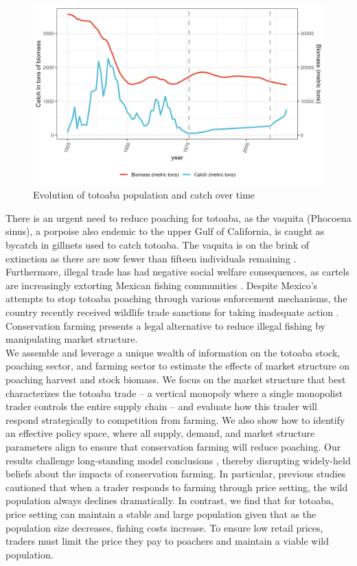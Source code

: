 \begin{figure}[H]
    \centering
    \includegraphics[width=0.8\linewidth]{figures/totoaba/Trends_stock_catch.png}
    \caption{Evolution of totoaba population and catch over time}
    \label{fig:trends_catch}
\end{figure}

There is an urgent need to reduce poaching for totoaba, as the vaquita (Phocoena sinus), a porpoise also endemic to the upper Gulf of California, is caught as bycatch in gillnets used to catch totoaba. The vaquita is on the brink of extinction as there are now fewer than fifteen individuals remaining \citep{rojas-bracho_more_2022}. Furthermore, illegal trade has had negative social welfare consequences, as cartels are increasingly extorting Mexican fishing communities \citep{felbab_brown_organized_2022}. Despite Mexico’s attempts to stop totoaba poaching through various enforcement mechanisms, the country recently received wildlife trade sanctions for taking inadequate action \citep{rojas-bracho_vaquitas_2013,cites_notification_2023}. Conservation farming presents a legal alternative to reduce illegal fishing by manipulating market structure. 
\\
We assemble and leverage a unique wealth of information on the totoaba stock, poaching sector, and farming sector to estimate the effects of market structure on poaching harvest and stock biomass. We focus on the market structure that best characterizes the totoaba trade – a vertical monopoly where a single monopolist trader controls the entire supply chain – and evaluate how this trader will respond strategically to competition from farming. We also show how to identify an effective policy space, where all supply, demand, and market structure parameters align to ensure that conservation farming will reduce poaching. Our results challenge long-standing model conclusions \citep{bulte_economic_2005, damania_economics_2007}, thereby disrupting widely-held beliefs about the impacts of conservation farming. In particular, previous studies cautioned that when a trader responds to farming through price setting, the wild population always declines dramatically. In contrast, we find that for totoaba, price setting can maintain a stable and large population given that as the population size decreases, fishing costs increase. To ensure low retail prices, traders must limit the price they pay to poachers and maintain a viable wild population.


